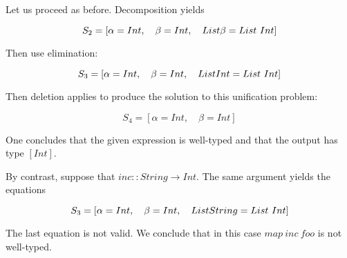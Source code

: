 Let us proceed as before.  Decomposition yields


\begin{equation}
S_2 = [\alpha = Int, \quad \beta = Int, \quad List\space \beta = List\ Int]
\end{equation}

Then use elimination:

\begin{equation}
S_3 = [\alpha = Int, \quad \beta = Int, \quad List\space Int = List\ Int]
\end{equation}

Then deletion applies to produce the solution to this unification problem:

\begin{equation}
S_4 = [\alpha = Int, \quad \beta = Int]
\end{equation}

One concludes that the given expression is well-typed and that the output has type $[Int]$.

By contrast, suppose that $inc ::  String \to Int$.  The same argument yields the equations

\begin{equation}
S_3 = [\alpha = Int, \quad \beta = Int, \quad List\space String = List\ Int]
\end{equation}

The last equation is not valid.  We conclude that in this case $map\ inc\ foo$ is not well-typed.

\bigskip



\bigskip

